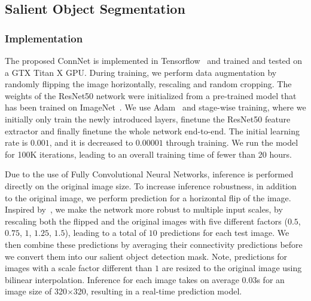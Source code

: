 \documentclass[journal]{IEEEtran}
\begin{document}
\subsection{Salient Object Segmentation}

\subsubsection{Implementation}
\label{sec:implementation}
The proposed ConnNet is implemented in Tensorflow~\cite{abadi2016tensorflow} and trained and tested on a GTX Titan X GPU. 
During training, we perform data augmentation by randomly flipping the image horizontally, rescaling and random cropping. The weights of the ResNet50 network were initialized from a pre-trained model that has been trained on ImageNet~\cite{deng2009imagenet}. 
We use Adam~\cite{kingma2014adam} and stage-wise training, where we initially only train the newly introduced layers, finetune the ResNet50 feature extractor and finally finetune the whole network end-to-end.
The initial learning rate is $0.001$, and it is decreased to $0.00001$ through training. 
We run the model for 100K iterations, leading to an overall training time of fewer than 20 hours.

Due to the use of Fully Convolutional Neural Networks, inference is performed directly on the original image size. To increase inference robustness, in addition to the original image, we perform prediction for a horizontal flip of the image. Inspired by~\cite{li2017instance}, we make the network more robust to multiple input scales, by rescaling both the flipped and the original images with five different factors ($0.5$, $0.75$, $1$, $1.25$, $1.5$), leading to a total of $10$ predictions for each test image. We then combine these predictions by averaging their connectivity predictions before we convert them into our salient object detection mask. Note, predictions for images with a scale factor different than $1$ are resized to the original image using bilinear interpolation. Inference for each image takes on average 0.03s for an image size of 320$\times$320, resulting in a real-time prediction model.
\end{document}
